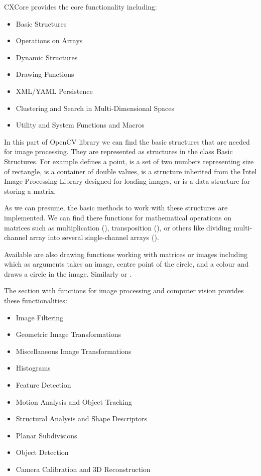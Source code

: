 CXCore provides the core functionality including:
\begin{itemize}

  \item Basic Structures
  \item Operations on Arrays
  \item Dynamic Structures
  \item Drawing Functions
  \item XML/YAML Persistence
  \item Clustering and Search in Multi-Dimensional Spaces
  \item Utility and System Functions and Macros

\end{itemize}

In this part of OpenCV library we can find the basic structures that are needed for image processing.
They are represented as structures in the class Basic Structures. For example  defines a point,  is a set of two numbers representing size of rectangle, 
 is a container of double values,  is a structure inherited from the Intel Image Processing Library designed for loading images, 
or  is a data structure for storing a matrix.

As we can presume, the basic methods to work with these structures are implemented.
We can find there functions for mathematical operations on matrices such as multiplication (), transposition (), or
others like dividing multi-channel array into several single-channel arrays ().

Available are also drawing functions working with matrices or images including  which as arguments takes an image, centre point of the circle,
and a colour and draws a circle in the image. Similarly  or .


The section with functions for image processing and computer vision provides these functionalities:
\begin{itemize}

  \item Image Filtering
  \item Geometric Image Transformations
  \item Miscellaneous Image Transformations
  \item Histograms
  \item Feature Detection
  \item Motion Analysis and Object Tracking
  \item Structural Analysis and Shape Descriptors
  \item Planar Subdivisions
  \item Object Detection
  \item Camera Calibration and 3D Reconstruction

\end{itemize}


